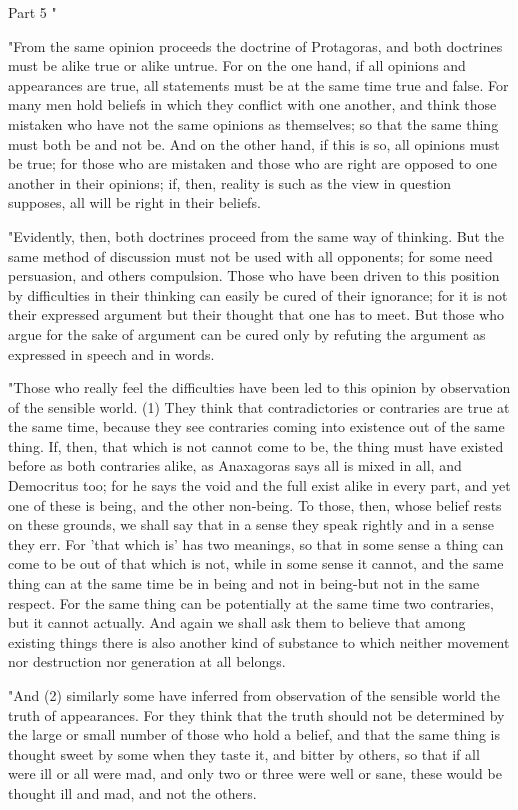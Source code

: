 Part 5 "

"From the same opinion proceeds the doctrine of Protagoras, and both
doctrines must be alike true or alike untrue. For on the one hand,
if all opinions and appearances are true, all statements must be at
the same time true and false. For many men hold beliefs in which they
conflict with one another, and think those mistaken who have not the
same opinions as themselves; so that the same thing must both be and
not be. And on the other hand, if this is so, all opinions must be
true; for those who are mistaken and those who are right are opposed
to one another in their opinions; if, then, reality is such as the
view in question supposes, all will be right in their beliefs.

"Evidently, then, both doctrines proceed from the same way of thinking.
But the same method of discussion must not be used with all opponents;
for some need persuasion, and others compulsion. Those who have been
driven to this position by difficulties in their thinking can easily
be cured of their ignorance; for it is not their expressed argument
but their thought that one has to meet. But those who argue for the
sake of argument can be cured only by refuting the argument as expressed
in speech and in words. 

"Those who really feel the difficulties have been led to this opinion
by observation of the sensible world. (1) They think that contradictories
or contraries are true at the same time, because they see contraries
coming into existence out of the same thing. If, then, that which
is not cannot come to be, the thing must have existed before as both
contraries alike, as Anaxagoras says all is mixed in all, and Democritus
too; for he says the void and the full exist alike in every part,
and yet one of these is being, and the other non-being. To those,
then, whose belief rests on these grounds, we shall say that in a
sense they speak rightly and in a sense they err. For 'that which
is' has two meanings, so that in some sense a thing can come to be
out of that which is not, while in some sense it cannot, and the same
thing can at the same time be in being and not in being-but not in
the same respect. For the same thing can be potentially at the same
time two contraries, but it cannot actually. And again we shall ask
them to believe that among existing things there is also another kind
of substance to which neither movement nor destruction nor generation
at all belongs. 

"And (2) similarly some have inferred from observation of the sensible
world the truth of appearances. For they think that the truth should
not be determined by the large or small number of those who hold a
belief, and that the same thing is thought sweet by some when they
taste it, and bitter by others, so that if all were ill or all were
mad, and only two or three were well or sane, these would be thought
ill and mad, and not the others. 

